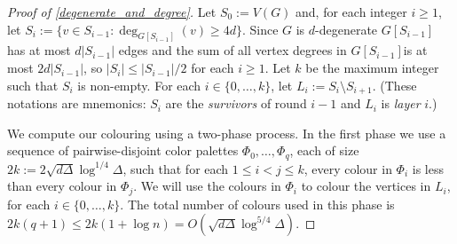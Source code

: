\documentclass{patmorin}
\newcommand{\defin}[1]{\emph{\color{brightmaroon}#1}}
\begin{document}
\begin{proof}[Proof of \cref{degenerate_and_degree}]
  Let $S_0:=V(G)$ and, for each integer $i\ge 1$, let $S_i:=\{v\in S_{i-1}:\deg_{G[S_{i-1}]}(v)\ge 4d\}$.  Since $G$ is $d$-degenerate $G[S_{i-1}]$ has at most $d|S_{i-1}|$ edges and the sum of all vertex degrees in $G[S_{i-1}]$is at most $2d|S_{i-1}|$, so $|S_i|\le |S_{i-1}|/2$ for each $i\ge 1$.  Let $k$ be the maximum integer such that $S_i$ is non-empty.  For each $i\in\{0,\ldots,k\}$, let $L_i:=S_i\setminus S_{i+1}$.  (These notations are mnemonics: $S_i$ are the \defin{survivors} of round $i-1$ and $L_i$ is \defin{layer} $i$.)


  We compute our colouring using a two-phase process. In the first phase we use a sequence of pairwise-disjoint color palettes $\Phi_0,\ldots,\Phi_{q}$, each of size $2k:=2\sqrt{d\Delta}\log^{1/4}\Delta$, such that for each $1\le i < j\le k$, every colour in $\Phi_i$ is less than every colour in $\Phi_j$.  We will use the colours in $\Phi_i$ to colour the vertices in $L_i$, for each $i\in\{0,\ldots,k\}$.  The total number of colours used in this phase is $2k(q+1)\le 2k(1+\log n)=O(\sqrt{d\Delta}\log^{5/4}\Delta)$.



\end{proof}
\end{document}
